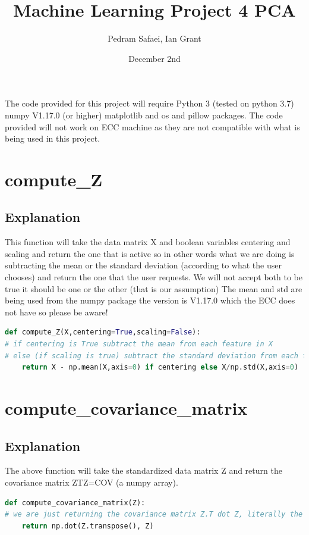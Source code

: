 \documentclass{article}
\title{Machine Learning Project 4 PCA}
\author{Pedram Safaei, Ian Grant }
\date{December 2nd}
\begin{document}
\maketitle
The code provided for this project will require Python 3 (tested on python 3.7) numpy V1.17.0 (or higher) matplotlib and os and pillow packages. The code provided will not work on ECC machine as they are not compatible with what is being used in this project.

\section{compute\_Z}
\subsection{Explanation}
This function will take the data matrix X and boolean variables centering and scaling and return the one that is active so in other words what we are doing is subtracting the mean or the standard deviation (according to what the user chooses) and return the one that the user requests. We  will not accept both to be true it should be one or the other (that is our assumption) The mean and std are being used from the numpy package the version is V1.17.0 which the ECC does not have so please be aware!

\begin{lstlisting}[language=Python]
def compute_Z(X,centering=True,scaling=False):
# if centering is True subtract the mean from each feature in X
# else (if scaling is true) subtract the standard deviation from each feature in X
	return X - np.mean(X,axis=0) if centering else X/np.std(X,axis=0)
\end{lstlisting}


\section{compute\_covariance\_matrix}
\subsection{Explanation}
The above function will take the standardized data matrix Z and return the covariance matrix ZTZ=COV (a numpy array).

\begin{lstlisting}[language=Python]
def compute_covariance_matrix(Z):
# we are just returning the covariance matrix Z.T dot Z, literally the easiest part of this project
	return np.dot(Z.transpose(), Z)
\end{lstlisting}
\end{document}
